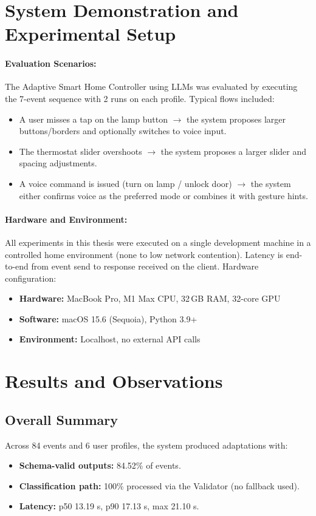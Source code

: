 \documentclass[openany]{book}
\begin{document}
\section{System Demonstration and Experimental Setup}
\paragraph{Evaluation Scenarios:}
The Adaptive Smart Home Controller using LLMs was evaluated by executing the 7-event sequence with 2 runs on each profile. Typical flows included:
\begin{itemize}
    \item A user misses a tap on the lamp button $\rightarrow$ the system proposes larger buttons/borders and optionally switches to voice input.
    \item The thermostat slider overshoots $\rightarrow$ the system proposes a larger slider and spacing adjustments.
    \item A voice command is issued (turn on lamp / unlock door) $\rightarrow$ the system either confirms voice as the preferred mode or combines it with gesture hints.
\end{itemize}

\paragraph{Hardware and Environment:}
All experiments in this thesis were executed on a single development machine in a controlled home environment (none to low network contention). Latency is end-to-end from event send to response received on the client.
Hardware configuration:
\begin{itemize}
    \item \textbf{Hardware:} MacBook Pro, M1 Max CPU, 32\,GB RAM, 32-core GPU
    \item \textbf{Software:} macOS 15.6 (Sequoia), Python 3.9+
    \item \textbf{Environment:} Localhost, no external API calls
\end{itemize}
\newpage
\section{Results and Observations}
\subsection{Overall Summary}
Across 84 events and 6 user profiles, the system produced adaptations with:
\begin{itemize}
    \item \textbf{Schema-valid outputs:} 84.52\% of events.
    \item \textbf{Classification path:} 100\% processed via the Validator (no fallback used).
    \item \textbf{Latency:} p50 13.19 s, p90 17.13 s, max 21.10 s.
\end{itemize}
\end{document}

